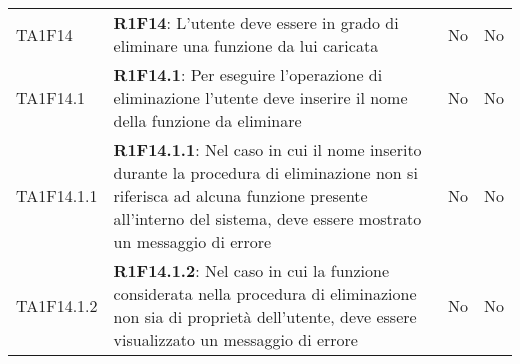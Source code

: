 \begin{longtable}{ 
		>{\centering}p{} 
		>{}p{} 
		>{\centering}p{}
		>{\centering}p{} }
	TA1F14 & \textbf{R1F14}: L'utente deve essere in grado di eliminare una funzione da lui caricata & No & No \tabularnewline
	TA1F14.1 & \textbf{R1F14.1}: Per eseguire l'operazione di eliminazione l'utente deve inserire 
		il nome della funzione da eliminare 										& No & No \tabularnewline
	TA1F14.1.1 & \textbf{R1F14.1.1}: Nel caso in cui il nome inserito durante la procedura di eliminazione
		non si riferisca ad alcuna funzione presente all'interno del sistema, deve 
		essere mostrato un messaggio di errore										& No & No \tabularnewline
	TA1F14.1.2 & \textbf{R1F14.1.2}: Nel caso in cui la funzione considerata nella procedura di eliminazione
		non sia di proprietà dell'utente, deve essere visualizzato un messaggio 
		di errore																	& No & No \tabularnewline

\end{longtable}